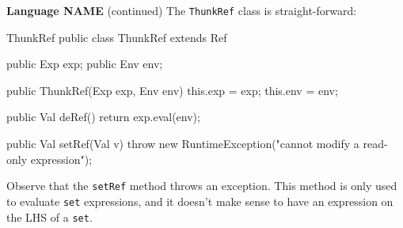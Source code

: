 \begin{minipage}[t]{\sw}
\slidenumber
\LARGE
{\bf Language NAME} (continued)\exx
The \verb'ThunkRef' class is straight-forward:
\large
\begin{qv}
ThunkRef
public class ThunkRef extends Ref {

    public Exp exp;
    public Env env;

    public ThunkRef(Exp exp, Env env) {
        this.exp = exp;
        this.env = env;
    }

    public Val deRef() {
        return exp.eval(env);
    }

    public Val setRef(Val v) {
        throw new RuntimeException("cannot modify a read-only expression");
    }
}
\end{qv}
\LARGE
Observe that the \verb'setRef' method throws an exception.
This method is only used to evaluate \verb'set' expressions,
and it doesn't make sense to have
an expression on the LHS of a \verb'set'.
\end{minipage}
